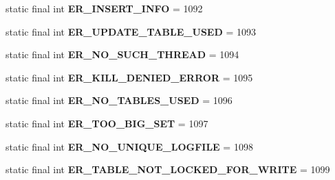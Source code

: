 \begin{DoxyCompactItemize}
static final int {\bfseries E\+R\+\_\+\+I\+N\+S\+E\+R\+T\+\_\+\+I\+N\+FO} = 1092
\item 
\mbox{\label{classcom_1_1mysql_1_1jdbc_1_1_mysql_error_numbers_a7d57a0c88c5145a062bdbd70600361fc}} 
static final int {\bfseries E\+R\+\_\+\+U\+P\+D\+A\+T\+E\+\_\+\+T\+A\+B\+L\+E\+\_\+\+U\+S\+ED} = 1093
\item 
\mbox{\label{classcom_1_1mysql_1_1jdbc_1_1_mysql_error_numbers_a7cf4cfb4a7fdd7bb839f4e3f3913ac28}} 
static final int {\bfseries E\+R\+\_\+\+N\+O\+\_\+\+S\+U\+C\+H\+\_\+\+T\+H\+R\+E\+AD} = 1094
\item 
\mbox{\label{classcom_1_1mysql_1_1jdbc_1_1_mysql_error_numbers_a10199669eae8c03b27cea620417889c6}} 
static final int {\bfseries E\+R\+\_\+\+K\+I\+L\+L\+\_\+\+D\+E\+N\+I\+E\+D\+\_\+\+E\+R\+R\+OR} = 1095
\item 
\mbox{\label{classcom_1_1mysql_1_1jdbc_1_1_mysql_error_numbers_a02614619db755df0305438768150bd81}} 
static final int {\bfseries E\+R\+\_\+\+N\+O\+\_\+\+T\+A\+B\+L\+E\+S\+\_\+\+U\+S\+ED} = 1096
\item 
\mbox{\label{classcom_1_1mysql_1_1jdbc_1_1_mysql_error_numbers_a4d475fd1c92e3c4f564dfc101a277ae1}} 
static final int {\bfseries E\+R\+\_\+\+T\+O\+O\+\_\+\+B\+I\+G\+\_\+\+S\+ET} = 1097
\item 
\mbox{\label{classcom_1_1mysql_1_1jdbc_1_1_mysql_error_numbers_a60977ad9936908e8f9859e4f8bf2ed1b}} 
static final int {\bfseries E\+R\+\_\+\+N\+O\+\_\+\+U\+N\+I\+Q\+U\+E\+\_\+\+L\+O\+G\+F\+I\+LE} = 1098
\item 
\mbox{\label{classcom_1_1mysql_1_1jdbc_1_1_mysql_error_numbers_ad118c7eec92ee73e27016b43ac1db679}} 
static final int {\bfseries E\+R\+\_\+\+T\+A\+B\+L\+E\+\_\+\+N\+O\+T\+\_\+\+L\+O\+C\+K\+E\+D\+\_\+\+F\+O\+R\+\_\+\+W\+R\+I\+TE} = 1099
\item 
\mbox{\label{classcom_1_1mysql_1_1jdbc_1_1_mysql_error_numbers_a0dbabc068eaf11d8ae435665fa5f03b9}} 

\end{DoxyCompactItemize}
